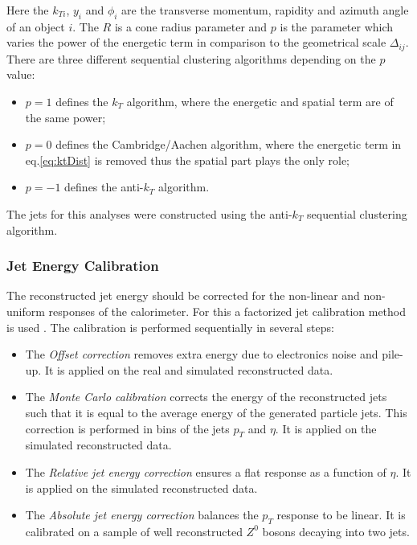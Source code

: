 Here the $k_{Ti}$, $y_{i}$ and $\phi_i$ are the transverse momentum, rapidity and azimuth angle of an object $i$. The $R$ is a cone radius parameter and 
$p$ is the parameter which varies the power of the energetic term in comparison to the geometrical scale $\Delta_{ij}$.
There are three different sequential clustering algorithms depending on the $p$ value:

\begin{itemize}
 \item $p = 1$ defines the $k_{T}$ algorithm, where the energetic and spatial term are of the same power;
 \item $p = 0$ defines the Cambridge/Aachen algorithm, where the energetic term in eq.\ref{eq:ktDist} is removed thus the spatial part plays the only role;
 \item $p = -1$ defines the anti-$k_{T}$ algorithm.
\end{itemize}

The jets for this analyses were constructed using the anti-$k_{T}$ sequential clustering algorithm. 

\subsubsection{Jet Energy Calibration}\label{ssec:JCal}

The reconstructed jet energy should be corrected for the non-linear and non-uniform responses of the calorimeter. For this a factorized jet calibration
method is used \cite{2011JInst...611002C}. The calibration is performed sequentially in several steps:

\begin{itemize}
 \item The \textit{Offset correction} removes extra energy due to electronics noise and pile-up. It is applied on the real and simulated reconstructed data.
 \item The \textit{Monte Carlo calibration} corrects the energy of the reconstructed jets such that it is equal to the average energy of the generated 
 particle jets. This correction is performed in bins of the jets $p_{T}$ and $\eta$. It is applied on the simulated reconstructed data.
 \item The \textit{Relative jet energy correction} ensures a flat response as a function of $\eta$. It is applied on the simulated reconstructed data.
 \item The \textit{Absolute jet energy correction} balances the $p_{T}$ response to be linear. It is calibrated on a sample of well reconstructed $Z^{0}$ bosons 
 decaying into two jets.
\end{itemize}

